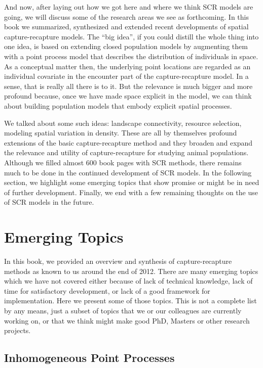 And now, after laying out how we got here and where we think SCR models are 
going, we will discuss some of the research areas we see as forthcoming. 
In this book we summarized, synthesized and extended recent
developments of spatial capture-recapture models. The ``big idea'',
if you could distill the whole thing into one idea, is based on
extending closed population models by augmenting them with a point
process model that describes the distribution of individuals
\citep{efford:2004} in space. As a conceptual matter then, the
underlying point locations are regarded as an individual covariate in
the encounter part of the capture-recapture model. In a sense, that is
really all there is to it. But the relevance is much bigger and more
profound because, once we have made space explicit in the model, 
we can think about building population models that embody explicit
spatial processes. 

We talked about some such ideas: landscape connectivity, resource
selection, modeling spatial variation in density. These are all by
themselves profound extensions of the basic capture-recapture method
and they broaden and expand the relevance and utility of
capture-recapture for studying animal populations.
Although we filled almost 600 book pages with SCR methods,
there remains much to be done in the continued development of SCR
models. In the following section, we highlight some emerging topics that show promise or might be in
need of further development. Finally, we end with a few remaining
thoughts on the use of SCR models in the future.



\section{Emerging Topics}

In this book, we provided an overview and synthesis of
capture-recapture methods as known to us around the end of 2012. There
are many emerging topics which we have not covered either because of
lack of technical knowledge, lack of time for satisfactory
development, or lack of a good framework for implementation. Here we
present some of those topics. This is not a complete list by any means,
just a subset of topics that we or our colleagues are currently working on, or that we think 
might make good PhD, Masters or other research projects.



\subsection{Inhomogeneous Point Processes}
\label{last.sec.ipp}


